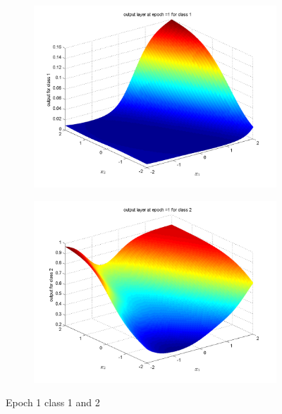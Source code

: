 \documentclass{article}
\begin{document}
\begin{figure}
\begin{subfigure}{.5\textwidth}
  \centering
  \includegraphics[width=.8\linewidth]{Classification/nonlinearlySeparable/1_1}
 
\end{subfigure}%
\begin{subfigure}{.5\textwidth}
  \centering
  \includegraphics[width=.8\linewidth]{Classification/nonlinearlySeparable/1_2}
  
\end{subfigure}
\caption{Epoch 1 class 1 and 2}
\end{figure}
\end{document}
